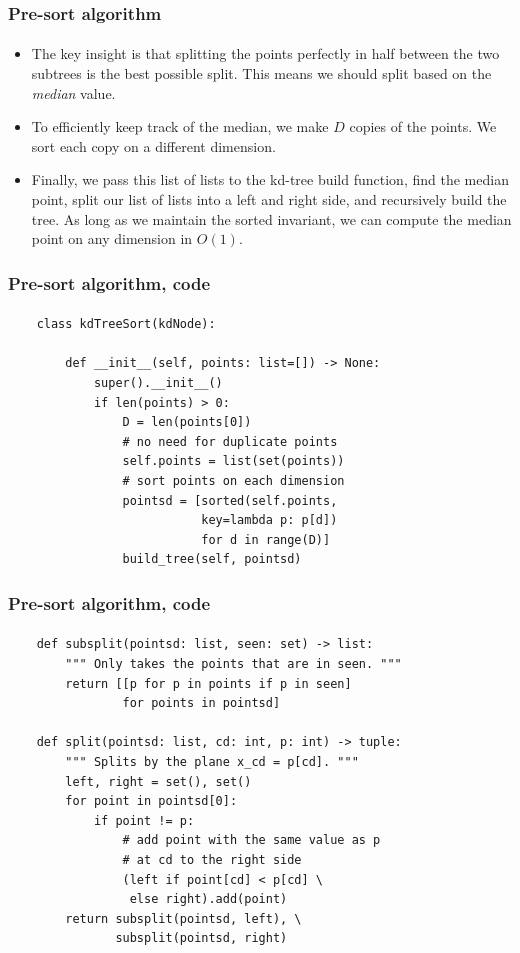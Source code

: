 \documentclass{beamer}                             %
\begin{document}
\begin{frame}
\frametitle{Pre-sort algorithm}
\framesubtitle{}
\begin{itemize}[<+->]
  \item The key insight is that splitting the points perfectly
    in half between the two subtrees is the best possible split.
    This means we should split based on the \emph{median} value.
  \item To efficiently keep track of the median, we make \( D \) copies
    of the points. We sort each copy on a different dimension.
  \item Finally, we pass this list of lists to the kd-tree build function, find
    the median point, split our list of lists into a left and right side, and
    recursively build the tree. As long as we maintain the sorted invariant, we
    can compute the median point on any dimension in \( O(1) \).
\end{itemize}
\end{frame}

\begin{frame}[fragile]
\frametitle{Pre-sort algorithm, code}
\framesubtitle{}
\begin{verbatim}
    class kdTreeSort(kdNode):

        def __init__(self, points: list=[]) -> None:
            super().__init__()
            if len(points) > 0:
                D = len(points[0])
                # no need for duplicate points
                self.points = list(set(points))
                # sort points on each dimension
                pointsd = [sorted(self.points,
                           key=lambda p: p[d])
                           for d in range(D)]
                build_tree(self, pointsd)
\end{verbatim}
\end{frame}

\begin{frame}[fragile]
\frametitle{Pre-sort algorithm, code}
\framesubtitle{}
\begin{verbatim}
    def subsplit(pointsd: list, seen: set) -> list:
        """ Only takes the points that are in seen. """
        return [[p for p in points if p in seen]
                for points in pointsd]

    def split(pointsd: list, cd: int, p: int) -> tuple:
        """ Splits by the plane x_cd = p[cd]. """
        left, right = set(), set()
        for point in pointsd[0]:
            if point != p:
                # add point with the same value as p
                # at cd to the right side
                (left if point[cd] < p[cd] \
                 else right).add(point)
        return subsplit(pointsd, left), \
               subsplit(pointsd, right)
\end{verbatim}
\end{frame}
\end{document}

